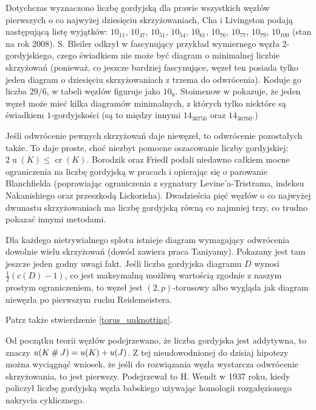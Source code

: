 Dotychczas wyznaczono liczbę gordyjską dla prawie wszystkich węzłów pierwszych o co najwyżej dziesięciu skrzyżowaniach, Cha i Livingston podają następującą listę wyjątków:  $10_{11}$, $10_{47}$, $10_{51}$, $10_{54}$, $10_{61}$, $10_{76}$, $10_{77}$, $10_{79}$, $10_{100}$ (stan na rok 2008).
S. Bleiler odkrył w \cite{bleiler84} fascynujący przykład wymiernego węzła $2$-gordyjskiego, czego świadkiem nie może być diagram o minimalnej liczbie skrzyżowań (ponieważ, co jeszcze bardziej fascynujące, węzeł ten posiada tylko jeden diagram o dziesięciu skrzyżowaniach z trzema do odwrócenia).
Koduje go liczba $29/6$, w tabeli węzłów figuruje jako $10_8$.
Stoimenow w \cite{stoimenow01} pokazuje, że jeden węzeł może mieć kilka diagramów minimalnych, z których tylko niektóre są świadkiem $1$-gordyjskości (są to między innymi $14_{36750}$ oraz $14_{36760}$.)

Jeśli odwrócenie pewnych skrzyżowań daje niewęzeł, to odwrócenie pozostałych także.
To daje proste, choć niezbyt pomocne oszacowanie liczby gordyjskiej: $2 \operatorname{u} (K) \le \operatorname{cr} (K)$. 
Borodzik oraz Friedl podali niedawno całkiem mocne ograniczenia na liczbę gordyjską w pracach \cite{borodzik14} i \cite{borodzik15} opierając się o parowanie Blanchfielda (poprawiając ograniczenia z sygnatury Levine'a-Tristrama, indeksu Nakanishiego oraz przeszkodą Lickorisha).
Dwadzieścia pięć węzłów o co najwyżej dwunastu skrzyżowaniach ma liczbę gordyjską równą co najmniej trzy, co trudno pokazać innymi metodami.


Dla każdego nietrywialnego splotu istnieje diagram wymagający odwrócenia  dowolnie wielu skrzyżowań (dowód zawiera praca \cite{taniyama09} Taniyamy).
Pokazany jest tam jeszcze jeden godny uwagi fakt.
Jeśli liczba gordyjska diagramu $D$ wynosi $\frac 12 (c(D) - 1)$, co jest maksymalną możliwą wartością zgodnie z naszym prostym ograniczeniem, to węzeł jest $(2,p)$-torusowy albo wygląda jak diagram niewęzła po pierwszym ruchu Reidemeistera.

Patrz także stwierdzenie \ref{torus_unknotting}.

Od początku teorii węzłów podejrzewano, że liczba gordyjska jest addytywna, to znaczy $u(K \mathbin{\#} J) = u(K) + u(J)$.
Z tej nieudowodnionej do dzisiaj hipotezy można wyciągnąć wniosek, że jeśli do rozwiązania węzła wystarcza odwrócenie skrzyżowania, to jest pierwszy.
Podejrzewał to H. Wendt w 1937 roku, kiedy policzył liczbę gordyjską węzła babskiego używając homologii rozgałęzionego nakrycia cyklicznego.

